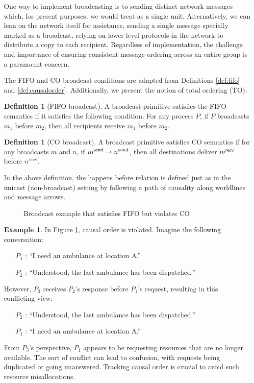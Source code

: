 \documentclass[]             %
{NASA}                       %
\theoremstyle{definition}
\newtheorem{example}[theorem]{Example}
\newtheorem{definition}[theorem]{Definition}
\providecommand{\tightlist}{%
  \setlength{\itemsep}{0pt}\setlength{\parskip}{0pt}}
\begin{document}
One way to implement broadcasting is to sending distinct network
messages which, for present purposes, we would treat as a single
unit. Alternatively, we can lean on the network itself for assistance,
sending a single message specially marked as a broadcast, relying on
lower-level protocols in the network to distribute a copy to each
recipient. Regardless of implementation, the challenge and importance
of ensuring consistent message ordering across an entire group is a
paramount concern.

The FIFO and CO broadcast conditions are adapted from Definitions
\ref{def:fifo} and \ref{def:causalorder}. Additionally, we present the
notion of total ordering (TO).

\begin{definition}[FIFO broadcast]
  \label{def:fifo-bcast}
  A broadcast primitive satisfies the FIFO semantics if it satisfies
  the following condition. For any process $P$, if $P$ broadcasts
  $m_1$ before $m_2$, then all recipients receive $m_1$ before $m_2$.
\end{definition}

\begin{definition}[CO broadcast]
  \label{def:causalorder-bcast}
  A broadcast primitive satisfies CO semantics if for any broadcasts
  $m$ and $n$, if $m_{}^{\mathsf{send}} \to n^{\textrm{send}}$, then all
  destinations deliver $m_{}^{\mathsf{recv}}$ before $n^{\textrm{recv}}$.
\end{definition}
In the above definition, the happens before relation is defined just
as in the unicast (non-broadcast) setting by following a path of
causality along worldlines and message arrows.

\begin{figure}[h]
  \centering 
  \caption{Broadcast example that satisfies FIFO but violates CO}
  \label{fig:broadcast-fifo-1}
\end{figure}

\begin{example}
  In Figure \ref{fig:broadcast-fifo-1}, causal order is violated. Imagine the following conversation:
  \begin{itemize}
    \tightlist
  \item [$P_1$]: ``I need an ambulance at location A.''
  \item [$P_2$]: ``Understood, the last ambulance has been dispatched.''
  \end{itemize}
  However, $P_3$ receives $P_2$'s response before $P_1$'s request, resulting in this conflicting view:
  \begin{itemize}
    \tightlist
  \item [$P_2$]: ``Understood, the last ambulance has been dispatched.''
  \item [$P_1$]: ``I need an ambulance at location A.''
  \end{itemize}
  From $P_3$'s perspective, $P_1$ appears to be requesting resources
  that are no longer available. The sort of conflict can lead to
  confusion, with requests being duplicated or going
  unanswered. Tracking causal order is crucial to avoid such resource
  misallocations.
\end{example}
\end{document}
